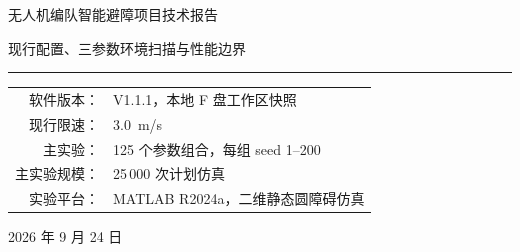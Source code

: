 \documentclass[UTF8,a4paper,11pt,fontset=windows]{ctexart}
\begin{document}
\hypersetup{pageanchor=false}
\begin{titlepage}
\thispagestyle{empty}
\centering
\vspace*{2.8cm}
{\heiti{} 无人机编队智能避障项目技术报告\par}
\vspace{0.9cm}
{\songti{} 现行配置、三参数环境扫描与性能边界\par}
\vspace{2.0cm}
\rule{0.75\textwidth}{0.5pt}\par
\vspace{1.0cm}
\begin{tabular}{@{}rl@{}}
软件版本： & V1.1.1，本地 F 盘工作区快照 \\
现行限速： & \SI{3.0}{m/s} \\
主实验： & 125 个参数组合，每组 seed 1--200 \\
主实验规模： & 25\,000 次计划仿真 \\
实验平台： & MATLAB R2024a，二维静态圆障碍仿真 \\
\end{tabular}
\vfill
{ 2026 年 9 月 24 日\par}
\end{titlepage}
\hypersetup{pageanchor=true}

\begin{abstract}
本项目以一架长机和四架僚机组成的领航--跟随编队为对象，在二维静态圆障碍环境中结合膨胀栅格规划、改进人工势场（APF）、Actor--Critic 自适应动态规划（ADP）及预测式避碰，实现目标到达和终端归队（以固定 V 形为基准，参考点保留避障修正）。现行源码的最大速度为 \SI{3}{m/s}，长机规划净空为 \SI{4.2}{m}；随机场景的整队可行性筛选采用更大的有效净空 \SI{5.6}{m}。

本次在障碍物数量 4--20 个、航线两侧散布半宽 10--30 m、障碍物最小边缘间距 1--5 m 的 125 个组合上，各运行 seed 1--200，共完成 25\,000 次计划试验。结果为 24\,783 次成功、1 次碰撞、7 次超时、209 次场景生成失败，无程序执行异常。对已生成并完成判定的 24\,791 张地图，飞行成功率为 99.9677\%；将生成失败纳入分母的整体成功比例为 99.132\%。在固定散布半宽 \SI{20}{m}、最小边缘间距 \SI{3}{m} 时，障碍物从 4 个增加到 20 个，成功样本平均完成时间从 \SI{32.37}{s} 增至 \SI{41.57}{s}，长机平均路径系数从 1.036 增至 1.309。

扫描中的飞行成功率接近上限，难以可靠区分多数参数组合的安全性能；高密度、小散布宽度和大间距的组合则暴露出场景生成约束。本报告只依据当前 \SI{3}{m/s} 配置下的三参数扫描与默认环境补测，讨论队形误差、局部稳定性和仿真适用范围。
\end{abstract}
\clearpage
\begingroup\small{}\tableofcontents\endgroup
\clearpage{}
\end{document}
